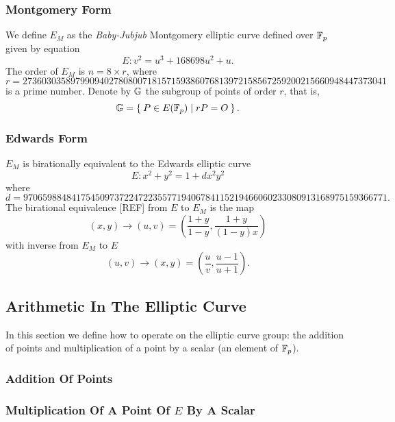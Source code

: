 \documentclass{article}
\begin{document}
\begin{spacing}{1.2}
		\subsubsection{Montgomery Form}
		We define $E_M$ as the {\it Baby-Jubjub} Montgomery elliptic curve defined over $\mathbb{F}_p$ given %
		by equation
		$$	E: v^2 = u^3 +  168698u^2 + u. $$
		The order of $E_M$ is $n = 8\times r$, where 
		$$	r = 2736030358979909402780800718157159386076813972
		158567259200215660948447373041 $$ 
		is a prime number. Denote by $\mathbb{G}$ the subgroup of points of order $r$, that is, %
		$$\mathbb{G} = \Set{ P \in E(\ensuremath{\mathbb{F}_p}) | r P = O  }.$$

		\subsubsection{Edwards Form}
		$E_M$ is birationally equivalent to the Edwards elliptic curve %
			$$	E: x^2 + y^2 = 1 +  d x^2 y^2 $$
		where
		$ d = 9706598848417545097372247223557719406784115219466060233080913168975159366771.$ \\
		
	
		The birational equivalence [REF] from $E$ to $E_M$ is the map
		$$ (x,y) \to (u,v) = \left( \frac{1 + y}{1 - y} , \frac{1 + y}{(1 - y)x} \right) $$
		with inverse from $E_M$ to $E$
		$$ (u, v) \to (x, y) = \left(  \frac{u}{v}, \frac{u - 1}{u + 1}   \right). $$
		
	\subsection{Arithmetic In The Elliptic Curve}
	In this section we define how to operate on the elliptic curve group: %
	the addition of points and multiplication of a point by a scalar (an element of $\mathbb{F}_p$).
	 	\subsubsection{Addition Of Points} 
	 	\subsubsection{Multiplication Of A Point Of $E$ By A Scalar} 


\end{spacing}
\end{document}
